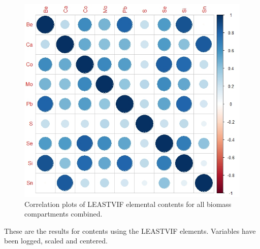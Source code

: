 \documentclass[
]{article}
\begin{document}
\begin{figure}
\includegraphics[width=1\linewidth]{Figures/CORRPLOT_1_LEAST_VIF} \caption[Correlation plots of LEASTVIF elemental contents for all biomass compartments combined]{Correlation plots of LEASTVIF elemental contents for all biomass compartments combined.}\label{fig:unnamed-chunk-11}
\end{figure}

\FloatBarrier

These are the results for contents using the LEASTVIF elements.
Variables have been logged, scaled and centered.

\newpage
\end{document}
